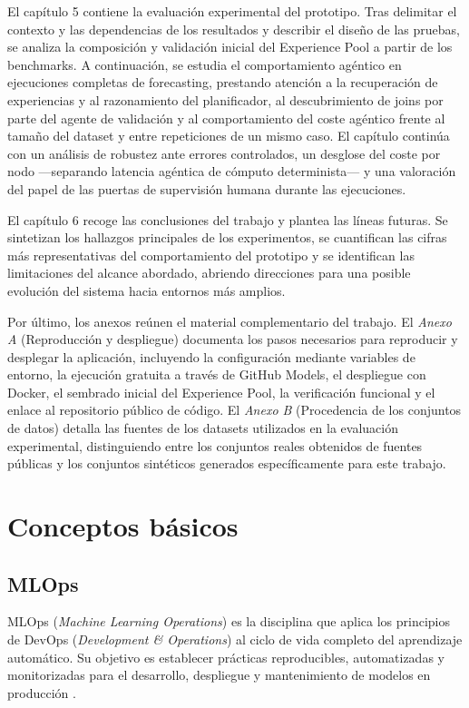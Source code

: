 \documentclass[12pt,a4paper]{article}
\theoremstyle{plain}
\begin{document}
El capítulo 5 contiene la evaluación experimental del prototipo. Tras delimitar el contexto y las dependencias de los resultados y describir el diseño de las pruebas, se analiza la composición y validación inicial del Experience Pool a partir de los benchmarks. A continuación, se estudia el comportamiento agéntico en ejecuciones completas de forecasting, prestando atención a la recuperación de experiencias y al razonamiento del planificador, al descubrimiento de joins por parte del agente de validación y al comportamiento del coste agéntico frente al tamaño del dataset y entre repeticiones de un mismo caso. El capítulo continúa con un análisis de robustez ante errores controlados, un desglose del coste por nodo ---separando latencia agéntica de cómputo determinista--- y una valoración del papel de las puertas de supervisión humana durante las ejecuciones.

El capítulo 6 recoge las conclusiones del trabajo y plantea las líneas futuras. Se sintetizan los hallazgos principales de los experimentos, se cuantifican las cifras más representativas del comportamiento del prototipo y se identifican las limitaciones del alcance abordado, abriendo direcciones para una posible evolución del sistema hacia entornos más amplios.

Por último, los anexos reúnen el material complementario del trabajo. El \emph{Anexo A} (Reproducción y despliegue) documenta los pasos necesarios para reproducir y desplegar la aplicación, incluyendo la configuración mediante variables de entorno, la ejecución gratuita a través de GitHub Models, el despliegue con Docker, el sembrado inicial del Experience Pool, la verificación funcional y el enlace al repositorio público de código. El \emph{Anexo B} (Procedencia de los conjuntos de datos) detalla las fuentes de los datasets utilizados en la evaluación experimental, distinguiendo entre los conjuntos reales obtenidos de fuentes públicas y los conjuntos sintéticos generados específicamente para este trabajo.


\newpage

\section{Conceptos básicos}

\subsection{MLOps}

MLOps (\emph{Machine Learning Operations}) es la disciplina que aplica los principios de DevOps (\emph{Development \& Operations}) al ciclo de vida completo del aprendizaje automático. Su objetivo es establecer prácticas reproducibles, automatizadas y monitorizadas para el desarrollo, despliegue y mantenimiento de modelos en producción \cite{google_mlops}.
\end{document}

